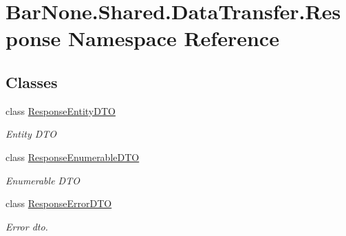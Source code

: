 \hypertarget{namespace_bar_none_1_1_shared_1_1_data_transfer_1_1_response}{}\section{Bar\+None.\+Shared.\+Data\+Transfer.\+Response Namespace Reference}
\label{namespace_bar_none_1_1_shared_1_1_data_transfer_1_1_response}
\subsection*{Classes}
\begin{DoxyCompactItemize}
\item 
class \mbox{\hyperlink{class_bar_none_1_1_shared_1_1_data_transfer_1_1_response_1_1_response_entity_d_t_o}{Response\+Entity\+D\+TO}}
\begin{DoxyCompactList}\small\item\em Entity D\+TO \end{DoxyCompactList}\item 
class \mbox{\hyperlink{class_bar_none_1_1_shared_1_1_data_transfer_1_1_response_1_1_response_enumerable_d_t_o}{Response\+Enumerable\+D\+TO}}
\begin{DoxyCompactList}\small\item\em Enumerable D\+TO \end{DoxyCompactList}\item 
class \mbox{\hyperlink{class_bar_none_1_1_shared_1_1_data_transfer_1_1_response_1_1_response_error_d_t_o}{Response\+Error\+D\+TO}}
\begin{DoxyCompactList}\small\item\em Error dto. \end{DoxyCompactList}\end{DoxyCompactItemize}
